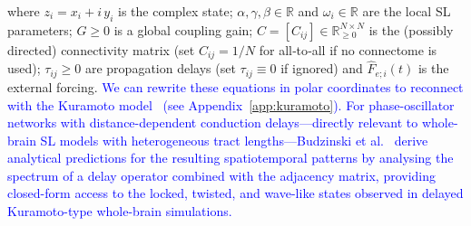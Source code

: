 \documentclass[12pt]{article}
\numberwithin{equation}{section}
\newcommand{\rev}[1]{\textcolor{blue}{#1}}
\begin{document}
where $z_i=x_i+i\,y_i$ is the complex state; $\alpha,\gamma,\beta\in\mathbb{R}$ and $\omega_i\in\mathbb{R}$ are the local SL parameters; $G\!\ge\!0$ is a global coupling gain; $C=[C_{ij}]\in\mathbb{R}_{\ge0}^{N\times N}$ is the (possibly directed) connectivity matrix (set $C_{ij}\!=\!1/N$ for all‑to‑all if no connectome is used); $\tau_{ij}\!\ge\!0$ are propagation delays (set $\tau_{ij}\!\equiv\!0$ if ignored) and $ \hat F_{e;i}(t)$ is the external forcing. \rev{We can rewrite these equations in polar coordinates to reconnect with the Kuramoto model~\cite{millanSynchronizationCoupledStuartLandau2025} (see Appendix~\ref{app:kuramoto}). For phase-oscillator networks with distance-dependent conduction delays---directly relevant to whole-brain SL models with heterogeneous tract lengths---Budzinski et al.~\cite{budzinski_2023} derive analytical predictions for the resulting spatiotemporal patterns by analysing the spectrum of a delay operator combined with the adjacency matrix, providing closed-form access to the locked, twisted, and wave-like states observed in delayed Kuramoto-type whole-brain simulations.}
\end{document}
